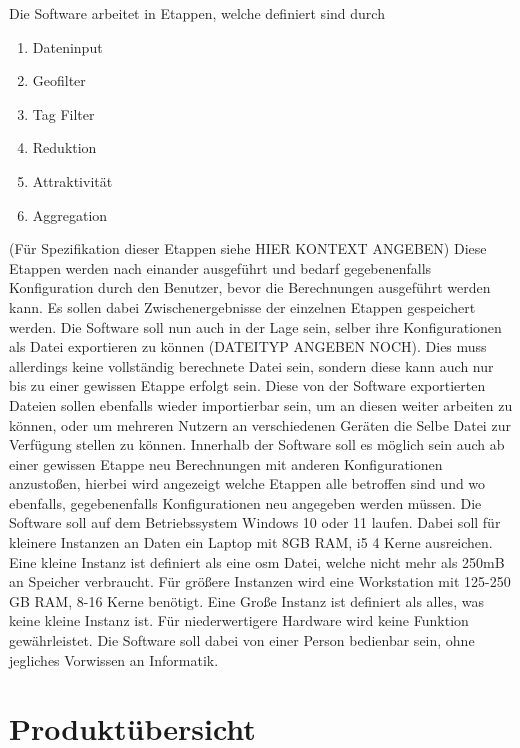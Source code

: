 \documentclass[parskip=full]{scrartcl} %
\begin{document}
\newpage
Die Software arbeitet in Etappen, welche definiert sind durch
\begin{enumerate}
    \item Dateninput
    \item Geofilter
    \item Tag Filter
    \item Reduktion
    \item Attraktivität
    \item Aggregation
\end{enumerate}

(Für Spezifikation dieser Etappen siehe HIER KONTEXT ANGEBEN)
\newline
Diese Etappen werden nach einander ausgeführt und bedarf gegebenenfalls Konfiguration durch den Benutzer, bevor die Berechnungen ausgeführt werden kann.
Es sollen dabei Zwischenergebnisse der einzelnen Etappen gespeichert werden.
Die Software soll nun auch in der Lage sein, selber ihre Konfigurationen als Datei exportieren zu können (DATEITYP ANGEBEN NOCH). Dies muss allerdings keine vollständig berechnete Datei sein, sondern diese kann auch nur bis zu einer gewissen Etappe erfolgt sein.
Diese von der Software exportierten Dateien sollen ebenfalls wieder importierbar sein, um an diesen weiter arbeiten zu können, oder um mehreren Nutzern an verschiedenen Geräten die Selbe Datei zur Verfügung stellen zu können.
Innerhalb der Software soll es möglich sein auch ab einer gewissen Etappe neu Berechnungen mit anderen Konfigurationen anzustoßen, hierbei wird angezeigt welche Etappen alle betroffen sind und wo ebenfalls, gegebenenfalls Konfigurationen neu angegeben werden müssen.
Die Software soll auf dem Betriebssystem Windows 10 oder 11 laufen.
Dabei soll für kleinere Instanzen an Daten ein Laptop mit 8GB RAM, i5 4 Kerne ausreichen.
Eine kleine Instanz ist definiert als eine osm Datei, welche nicht mehr als 250mB an Speicher verbraucht.
Für größere Instanzen wird eine Workstation mit 125-250 GB RAM, 8-16 Kerne benötigt.
Eine Große Instanz ist definiert als alles, was keine kleine Instanz ist.
Für niederwertigere Hardware wird keine Funktion gewährleistet.
Die Software soll dabei von einer Person bedienbar sein, ohne jegliches Vorwissen an Informatik.

\newpage



\section{Produktübersicht}
\newpage
\end{document}
